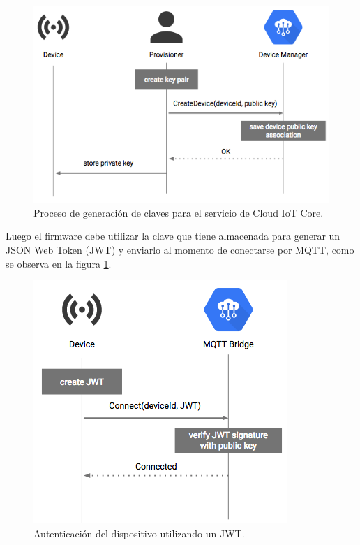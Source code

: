 \begin{figure}[h]
\centering
\includegraphics[scale=0.55]{./Figures/device_key.png}
\caption[Proceso de generación de claves para el servicio de Cloud IoT Core.]{Proceso de generación de claves para el servicio de Cloud IoT Core.\footnotemark}
\label{fig:device_key}
\end{figure}



Luego el firmware debe utilizar la clave que tiene almacenada para generar un JSON Web Token (JWT) \citep{jwt} y enviarlo al momento de conectarse por MQTT, como se observa en la figura \ref{fig:device_key}.

\begin{figure}[h]
\centering
\includegraphics[scale=0.7]{./Figures/device_jwt.png}
\caption[Autenticación del dispositivo utilizando un JWT.]{Autenticación del dispositivo utilizando un JWT.\footnotemark}
\label{fig:device_jwt}
\end{figure}

